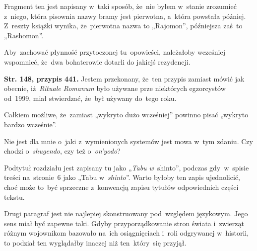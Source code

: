 \documentclass[a4paper,11pt]{article}
\numberwithin{equation}{section}
\begin{document}
 Fragment ten jest napisany w~taki sposób,
że~nie byłem w~stanie zrozumieć z~niego, która pisownia nazwy bramy
jest pierwotna, a~która powstała później. Z~reszty książki wynika,
że~pierwotna nazwa to „Rajomon”, %
późniejsza zaś~to „Rashomon”. %

\VerSpaceFour





 Aby~zachować płynność przytoczonej
tu~opowieści, należałoby wcześniej wspomnieć, że~dwa bohaterowie
dotarli do jakiejś rezydencji.

\VerSpaceFour





\textbf{Str. 148, przypis 441.} Jestem przekonany, że~ten przypis
zamiast mówić jak obecnie, iż~\textit{Rituale Romanum} było używane prze
niektórych egzorcystów od~1999, miał stwierdzać, że~był używany
do~tego roku.

\VerSpaceFour





 Całkiem możliwe, że~zamiast „wykryto dużo
wcześniej” powinno pisać „wykryto bardzo wcześnie”.

\VerSpaceFour





 Nie jest dla mnie o~jaki z~wymienionych systemów
jest mowa w~tym zdaniu. Czy chodzi o~\textit{shugendo}, %
czy też o~\textit{on'yodo}? %

\VerSpaceFour





 Podtytuł rozdziału jest zapisany tu jako „\textit{Tabu
  w}~shinto”, %
podczas gdy~w~spisie treści na~stronie~6 jako „Tabu
w~\textit{shinto}”. %
Warto byłoby ten zapis ujednolicić, choć może to~być sprzeczne
z~konwencją zapisu tytułów odpowiednich części tekstu.

\VerSpaceFour





 Drugi paragraf jest nie najlepiej skonstruowany
pod~względem językowym. Jego sens miał być zapewne taki. Gdyby
przyporządkowanie stron świata i~zwierząt różnym wojownikom bazowało
na~ich osiągnięciach i~roli odgrywanej w~historii, to podział ten
wyglądałby inaczej niż ten~który~się przyjął.
\end{document}
